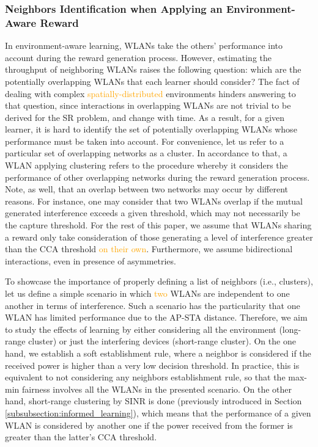 \documentclass[preprint,12pt]{elsarticle}
\begin{document}
\subsubsection{Neighbors Identification when Applying an Environment-Aware Reward}
\label{subsubsection:clustering}
In environment-aware learning, WLANs take the others' performance into account during the reward generation process. However, estimating the throughput of neighboring WLANs raises the following question: which are the potentially overlapping WLANs that each learner should consider? The fact of dealing with complex \textcolor{orange}{spatially-distributed} environments hinders answering to that question, since interactions in overlapping WLANs are not trivial to be derived for the SR problem, and change with time. As a result, for a given learner, it is hard to identify the set of potentially overlapping WLANs whose performance must be taken into account. For convenience, let us refer to a particular set of overlapping networks as a cluster. In accordance to that, a WLAN applying clustering refers to the procedure whereby it considers the performance of other overlapping networks during the reward generation process. Note, as well, that an overlap between two networks may occur by different reasons. For instance, one may consider that two WLANs overlap if the mutual generated interference exceeds a given threshold, which may not necessarily be the capture threshold. For the rest of this paper, we assume that WLANs sharing a reward only take consideration of those generating a level of interference greater than the CCA threshold \textcolor{orange}{on their own}. Furthermore, we assume bidirectional interactions, even in presence of asymmetries.

To showcase the importance of properly defining a list of neighbors (i.e., clusters), let us define a simple scenario in which \textcolor{orange}{two} WLANs are independent to one another in terms of interference. Such a scenario has the particularity that one WLAN has limited performance due to the AP-STA distance. Therefore, we aim to study the effects of learning by either considering all the environment (long-range cluster) or just the interfering devices (short-range cluster). On the one hand, we establish a soft establishment rule, where a neighbor is considered if the received power is higher than a very low decision threshold. In practice, this is equivalent to not considering any neighbors establishment rule, so that the max-min fairness involves all the WLANs in the presented scenario. On the other hand, short-range clustering by SINR is done (previously introduced in Section \ref{subsubsection:informed_learning}), which means that the performance of a given WLAN is considered by another one if the power received from the former is greater than the latter's CCA threshold.%
\end{document}
